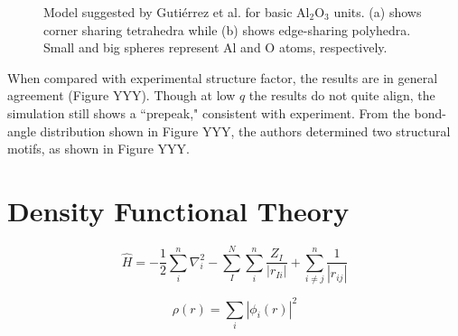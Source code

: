 \documentclass[3p,review,12pt]{elsarticle}
\begin{document}
\begin{figure}[H]
\begin{minipage}[b]{0.45\textwidth}
		\centering
		\caption{Model suggested by Guti\'errez et al. \cite{Gutierrez2002} for basic Al$_{2}$O$_{3}$ units. (a) shows corner sharing tetrahedra while (b) shows edge-sharing polyhedra. Small and big spheres represent Al and O atoms, respectively. }
	\end{minipage}
\end{figure}
\par 
When compared with experimental structure factor, the results are in general agreement (Figure YYY). Though at low $q$ the results do not quite align, the simulation still shows a ``prepeak," consistent with experiment. From the bond-angle distribution shown in Figure YYY, the authors determined two structural motifs, as shown in Figure YYY.







\section{Density Functional Theory}
\begin{equation}
\hat{H}=-\frac{1}{2}\sum_{i}^{n}\nabla_{i}^{2}-\sum_{I}^{N}\sum_{i}^{n}\frac{Z_{I}}{|r_{Ii}|}+\sum_{i\neq j}^{n}\frac{1}{|r_{ij}|}
\end{equation}

\begin{equation}
\rho (r) = \sum_{i}|\phi _{i}(r)|^{2}
\end{equation}
\end{document}
